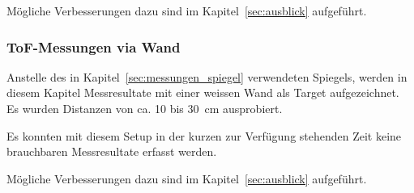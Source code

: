 Mögliche Verbesserungen dazu sind im Kapitel~\ref{sec:ausblick} aufgeführt. %

\subsubsection{ToF-Messungen via Wand}\label{sec:messungen_wand}

Anstelle des in Kapitel~\ref{sec:messungen_spiegel} verwendeten Spiegels, werden in diesem Kapitel Messresultate mit
einer weissen Wand als Target aufgezeichnet. Es wurden Distanzen von ca. 10 bis 30~cm ausprobiert.

Es konnten mit diesem Setup in der kurzen zur Verfügung stehenden Zeit keine brauchbaren Messresultate erfasst werden.

Mögliche Verbesserungen dazu sind im Kapitel~\ref{sec:ausblick} aufgeführt. %
